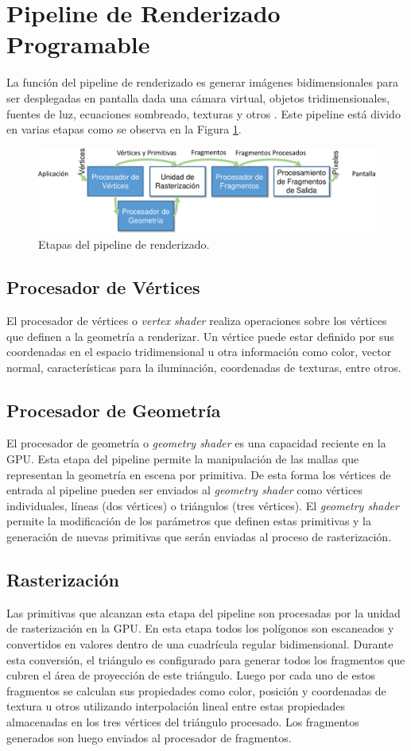 \section{Pipeline de Renderizado Programable}
La función del pipeline de renderizado es generar imágenes bidimensionales para ser desplegadas en pantalla dada una cámara virtual, objetos tridimensionales, fuentes de luz, ecuaciones sombreado, texturas y otros \cite{Akenine-Moller:2002:RR:553838}. Este pipeline está divido en varias etapas como se observa en la Figura \ref{fig:pipeline_rendering}.
\begin{figure}[H]
	\centering
	\includegraphics[width=\linewidth]{media/pipeline_rendering.pdf}
	\caption{Etapas del pipeline de renderizado.}
	\label{fig:pipeline_rendering}
\end{figure}
\subsection{Procesador de Vértices}
El procesador de vértices o \emph{vertex shader} realiza operaciones sobre los vértices que definen a la geometría a renderizar. Un vértice puede estar definido por sus coordenadas en el espacio tridimensional u otra información como color, vector normal, características para la iluminación, coordenadas de texturas, entre otros.
\subsection{Procesador de Geometría}
El procesador de geometría o \emph{geometry shader} es una capacidad reciente en la \ac{GPU}. Esta etapa del pipeline permite la manipulación de las mallas que representan la geometría en escena por primitiva. De esta forma los vértices de entrada al pipeline pueden ser enviados al \emph{geometry shader} como vértices individuales, líneas (dos vértices) o triángulos (tres vértices). El \emph{geometry shader} permite la modificación de los parámetros que definen estas primitivas y la generación de nuevas primitivas que serán enviadas al proceso de rasterización.
\subsection{Rasterización}
Las primitivas que alcanzan esta etapa del pipeline son procesadas por la unidad de rasterización en la \ac{GPU}. En esta etapa todos los polígonos son escaneados y convertidos en valores dentro de una cuadrícula regular bidimensional. Durante esta conversión, el triángulo es configurado para generar todos los fragmentos que cubren el área de proyección de este triángulo. Luego por cada uno de estos fragmentos se calculan sus propiedades como color, posición y coordenadas de textura u otros utilizando interpolación lineal entre estas propiedades almacenadas en los tres vértices del triángulo procesado. Los fragmentos generados son luego enviados al procesador de fragmentos.
